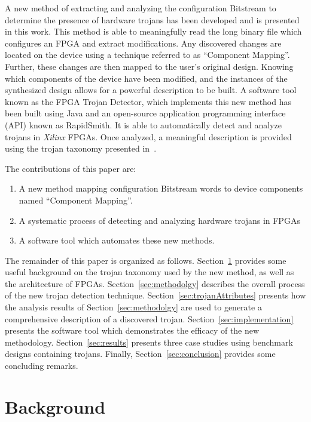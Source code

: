 \documentclass[journal, hidelinks]{IEEEtran}
\begin{document}
A new method of extracting and analyzing the configuration Bitstream to determine the presence of hardware trojans has been developed and is presented in this work.
This method is able to meaningfully read the long binary file which configures an FPGA and extract modifications.
Any discovered changes are located on the device using a technique referred to as ``Component Mapping''.
Further, these changes are then mapped to the user's original design.
Knowing which components of the device have been modified, and the instances of the synthesized design allows for a powerful description to be built.
A software tool known as the FPGA Trojan Detector, which implements this new method has been built using Java and an open-source application programming interface (API) known as RapidSmith. 
It is able to automatically detect and analyze trojans in \textit{Xilinx} FPGAs.
Once analyzed, a meaningful description is provided using the trojan taxonomy presented in~\cite{samerAttribute}.

The contributions of this paper are:
\begin{enumerate}
	\item A new method mapping configuration Bitstream words to device components named ``Component Mapping''.
	\item A systematic process of detecting and analyzing hardware trojans in FPGAs
	\item A software tool which automates these new methods.
\end{enumerate}

The remainder of this paper is organized as follows.
Section~\ref{sec:background} provides some useful background on the trojan taxonomy used by the new method, as well as the architecture of FPGAs.
Section~\ref{sec:methodolgy} describes the overall process of the new trojan detection technique.
Section~\ref{sec:trojanAttributes} presents how the analysis results of Section~\ref{sec:methodolgy} are used to generate a comprehensive description of a discovered trojan.
Section~\ref{sec:implementation} presents the software tool which demonstrates the efficacy of the new methodology.
Section~\ref{sec:results} presents three case studies using benchmark designs containing trojans.
Finally, Section~\ref{sec:conclusion} provides some concluding remarks.

\section{Background} \label{sec:background}
\end{document}
